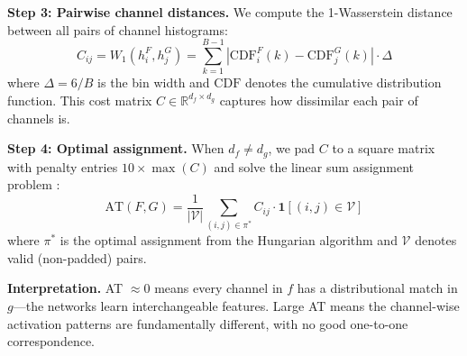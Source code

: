 \documentclass{article}
\begin{document}
\textbf{Step 3: Pairwise channel distances.} We compute the 1-Wasserstein distance between all pairs of channel histograms:
\begin{equation}
    C_{ij} = W_1(h_i^F, h_j^G) = \sum_{k=1}^{B-1} \left| \text{CDF}_i^F(k) - \text{CDF}_j^G(k) \right| \cdot \Delta
\end{equation}
where $\Delta = 6/B$ is the bin width and $\text{CDF}$ denotes the cumulative distribution function. This cost matrix $C \in \mathbb{R}^{d_f \times d_g}$ captures how dissimilar each pair of channels is.

\textbf{Step 4: Optimal assignment.} When $d_f \neq d_g$, we pad $C$ to a square matrix with penalty entries $10 \times \max(C)$ and solve the linear sum assignment problem \citep{kuhn1955hungarian}:
\begin{equation}
    \text{AT}(F, G) = \frac{1}{|\mathcal{V}|} \sum_{(i,j) \in \pi^*} C_{ij} \cdot \mathbf{1}[(i,j) \in \mathcal{V}]
\end{equation}
where $\pi^*$ is the optimal assignment from the Hungarian algorithm and $\mathcal{V}$ denotes valid (non-padded) pairs.

\textbf{Interpretation.} AT $\approx 0$ means every channel in $f$ has a distributional match in $g$---the networks learn interchangeable features. Large AT means the channel-wise activation patterns are fundamentally different, with no good one-to-one correspondence.
\end{document}
